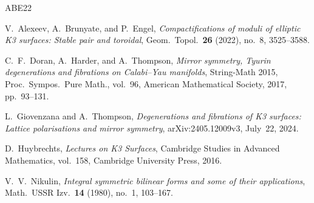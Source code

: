 \documentclass[11pt]{article}
\theoremstyle{remark}
\begin{document}
\begin{thebibliography}{ABE22}

V.~Alexeev, A.~Brunyate, and P.~Engel,
\emph{Compactifications of moduli of elliptic K3 surfaces:
Stable pair and toroidal},
Geom.\ Topol.\ \textbf{26} (2022), no.~8, 3525--3588.

C.~F.~Doran, A.~Harder, and A.~Thompson,
\emph{Mirror symmetry, Tyurin degenerations and fibrations on
Calabi--Yau manifolds},
String-Math 2015, Proc.\ Sympos.\ Pure Math., vol.~96,
American Mathematical Society, 2017, pp.~93--131.

L.~Giovenzana and A.~Thompson,
\emph{Degenerations and fibrations of K3 surfaces:
Lattice polarisations and mirror symmetry},
arXiv:2405.12009v3, July~22, 2024.

D.~Huybrechts,
\emph{Lectures on K3 Surfaces},
Cambridge Studies in Advanced Mathematics, vol.~158,
Cambridge University Press, 2016.

V.~V.~Nikulin,
\emph{Integral symmetric bilinear forms and some of their applications},
Math.\ USSR Izv.\ \textbf{14} (1980), no.~1, 103--167.

\end{thebibliography}
\end{document}
